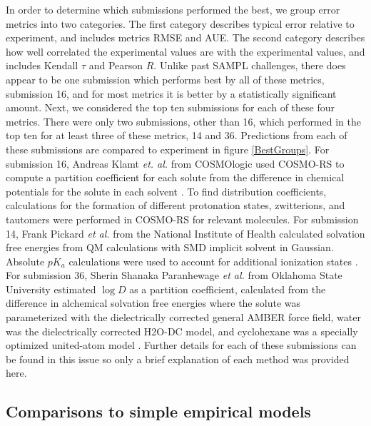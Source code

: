 In order to determine which submissions performed the best, we group error metrics into two categories. 
The first category describes typical error relative to experiment, and includes metrics RMSE and AUE. 
The second category describes how well correlated the experimental values are with the experimental values, and includes Kendall $\tau$ and Pearson $R$.
Unlike past SAMPL challenges, there does appear to be one submission which performs best by all of these metrics, submission 16, and for most metrics it is better by a statistically significant amount. 
Next, we considered the top ten submissions for each of these four metrics. 
There were only two submissions, other than 16, which performed in the top ten for at least three of these metrics, 14 and 36. 
Predictions from each of these submissions are compared to experiment in figure \ref{BestGroups}. 
For submission 16, Andreas Klamt \emph{et. al.} from COSMOlogic used COSMO-RS to compute a partition coefficient for each solute from the difference in chemical potentials for the solute in each solvent  \cite{Klamt:sampl5}.
To find distribution coefficients, calculations for the formation of different protonation states, zwitterions, and tautomers were performed in COSMO-RS for relevant molecules. 
For submission 14, Frank Pickard \emph{et al.} from the National Institute of Health calculated solvation free energies from QM calculations with SMD implicit solvent in Gaussian.
Absolute $pK_a$ calculations were used to account for additional ionization states  \cite{Pickard:sampl5}.
For submission 36, Sherin Shanaka Paranhewage \emph{et al.} from Oklahoma State University estimated $\log D$ as a partition coefficient, calculated from the difference in alchemical solvation free energies where the solute was parameterized with the dielectrically corrected general AMBER force field, water was the dielectrically corrected H2O-DC model, and cyclohexane was a specially optimized united-atom model  \cite{Paranahewage:sampl5}.
Further details for each of these submissions can be found in this issue so only a brief explanation of each method was provided here. 

\subsection{Comparisons to simple empirical models} 


